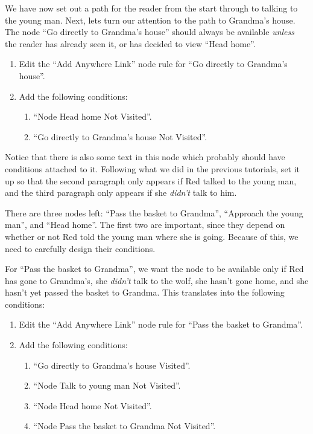 \documentclass{article}
\begin{document}
We have now set out a path for the reader from the start through to talking to the young man. Next, lets turn our attention to the path to Grandma's house. The node ``Go directly to Grandma's house'' should always be available \textit{unless} the reader has already seen it, or has decided to view ``Head home''.

\begin{enumerate}
  \item Edit the ``Add Anywhere Link'' node rule for ``Go directly to Grandma's house''.
  \item Add the following conditions: 
  \begin{enumerate}
  \item ``Node Head home Not Visited''.
  \item ``Go directly to Grandma's house Not Visited''.
\end{enumerate}
\end{enumerate}

Notice that there is also some text in this node which probably should have conditions attached to it. Following what we did in the previous tutorials, set it up so that the second paragraph only appears if Red talked to the young man, and the third paragraph only appears if she \textit{didn't} talk to him.

There are three nodes left: ``Pass the basket to Grandma'', ``Approach the young man'', and ``Head home''. The first two are important, since they depend on whether or not Red told the young man where she is going. Because of this, we need to carefully design their conditions.

For ``Pass the basket to Grandma'', we want the node to be available only if Red has gone to Grandma's, she \textit{didn't} talk to the wolf, she hasn't gone home, and she hasn't yet passed the basket to Grandma. This translates into the following conditions:

\begin{enumerate}
  \item Edit the ``Add Anywhere Link'' node rule for ``Pass the basket to
  Grandma''.
  \item Add the following conditions:
  \begin{enumerate}
  \item ``Go directly to Grandma's house Visited''.
  \item ``Node Talk to young man Not Visited''.
  \item ``Node Head home Not Visited''.
  \item ``Node Pass the basket to Grandma Not Visited''.
\end{enumerate}
\end{enumerate}
\end{document}
